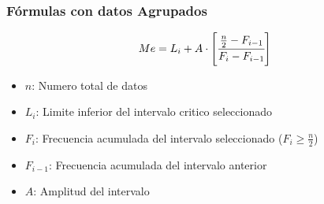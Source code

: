 \documentclass{article}
\begin{document}
        \subsubsection{Fórmulas con datos Agrupados}
            \[Me = L_i + A\cdot\left[\cfrac{\frac{n}{2} - F_{i-1}}{F_i - F_{i-1}}\right]\]
            \begin{itemize}
                \item $n$: Numero total de datos
                \item $L_i$: Limite inferior del intervalo critico seleccionado
                \item $F_i$: Frecuencia acumulada del intervalo seleccionado ($F_i \geq \frac{n}{2}$)
                \item $F_{i-1}$: Frecuencia acumulada del intervalo anterior
                \item $A$: Amplitud del intervalo                
            \end{itemize}
\end{document}
